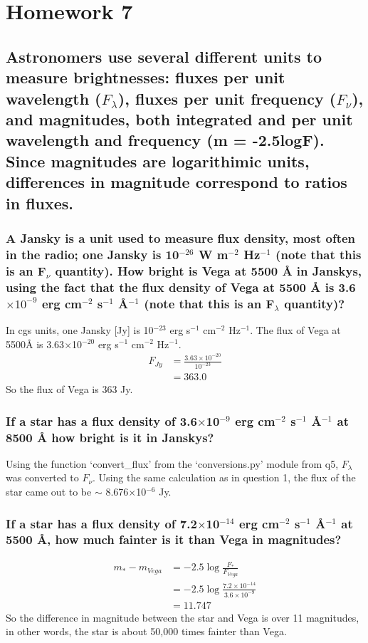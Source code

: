 \documentclass[12pt]{article}
\begin{document}
%

\section*{Homework 7}
\date{01/29/2016}
\subsection*{Astronomers use several different units to measure
brightnesses: fluxes per unit wavelength ($F_{\lambda}$),
fluxes per unit frequency ($F_{\nu}$), and magnitudes, both
integrated and per unit wavelength and frequency (m = -2.5logF).
Since magnitudes are logarithimic units, differences in magnitude
correspond to ratios in fluxes.}

\subsubsection{A Jansky is a unit used to measure flux density,
most often in the radio; one Jansky is 10$^{-26}$ W m$^{-2}$ Hz$^{-1}$
(note that this is an F$_{\nu}$ quantity).
How bright is Vega at 5500 \AA{} in Janskys, using the fact that the
flux density of Vega at 5500 \AA{}
is 3.6 $\times 10^{-9}$ erg cm$^{-2}$ s$^{-1}$ \AA{}$^{-1}$
(note that this is an F$_{\lambda}$ quantity)?}

In cgs units, one Jansky [Jy] is 10$^{-23}$
erg s$^{-1}$ cm$^{-2}$ Hz$^{-1}$. 
The flux of Vega at 5500\AA{} is 3.63$\times$10$^{-20}$
erg s$^{-1}$ cm$^{-2}$ Hz$^{-1}$.
\begin{align*}
    F_{Jy} &= \frac{3.63\times10^{-20}}{10^{-23}}\\
    &= 363.0
\end{align*}
So the flux of Vega is 363 Jy.


\subsubsection{If a star has a flux density of
3.6$\times$10$^{-9}$ erg cm$^{-2}$ s$^{-1}$ \AA{}$^{-1}$
at 8500 \AA{} how bright is it in Janskys?}
Using the function `convert\_flux' from the `conversions.py' module
from q5,
$F_{\lambda}$ was converted to $F_{\nu}$.
Using the same calculation
as in question 1, the flux of the star came out to be
$\sim$ 8.676$\times$10$^{-6}$ Jy.

\subsubsection{If a star has a flux density of 7.2$\times$10$^{-14}$
erg cm$^{-2}$ s$^{-1}$ \AA{}$^{-1}$ at 5500 \AA{},
how much fainter is it than Vega in magnitudes? }
\begin{align*}
    m_* - m_{Vega} &= -2.5 \log \frac{F_*}{F_{Vega}}\\
    &= -2.5 \log \frac{7.2\times10^{-14}}{3.6\times10^{-9}}\\
    &= 11.747
\end{align*}
So the difference in magnitude between the star and Vega is over 11
magnitudes, in other words, the star is about 50,000 times fainter
than Vega.

%
\end{document}
